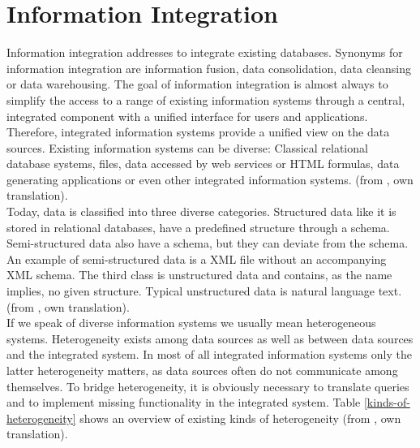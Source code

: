 \section{Information Integration}

Information integration addresses to integrate existing databases. Synonyms for information integration are information fusion, data consolidation, data cleansing or data warehousing. The goal of information integration is almost always to simplify the access to a range of existing information systems through a central, integrated component with a unified interface for users and applications. Therefore, integrated information systems provide a unified view on the data sources. Existing information systems can be diverse: Classical relational database systems, files, data accessed by web services or HTML formulas, data generating applications or even other integrated information systems. (from \cite[p. 3-4]{DBLP:books/dp/LeserN2006}, own translation).\\
Today, data is classified into three diverse categories. Structured data like it is stored in relational databases, have a predefined structure through a schema.
Semi-structured data also have a schema, but they can deviate from the schema. An example of semi-structured data is a XML file without an accompanying XML schema. The third class is unstructured data and contains, as the name implies, no given structure. Typical unstructured data is natural language text.
(from \cite[p. 17]{DBLP:books/dp/LeserN2006}, own translation).\\
If we speak of diverse information systems we usually mean heterogeneous systems. Heterogeneity exists among data sources as well as between data sources and the integrated system. In most of all integrated information systems only the latter heterogeneity matters, as data sources often do not communicate among themselves. 
To bridge heterogeneity, it is obviously necessary to translate queries and to implement missing functionality in the integrated system. Table \ref{kinds-of-heterogeneity} shows an overview of existing kinds of heterogeneity (from \cite[p. 60/61]{DBLP:books/dp/LeserN2006}, own translation).

